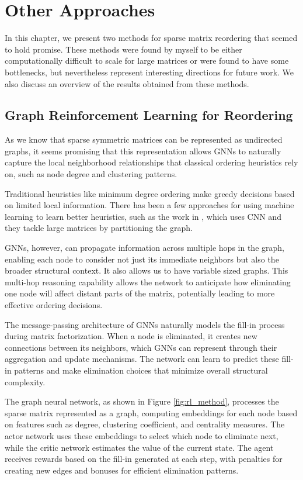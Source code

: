 \chapter{Other Approaches}
\label{ch:other_approaches}

In this chapter, we present two methods for sparse matrix reordering that seemed to hold promise. These methods were found by myself to be either computationally difficult to scale for large matrices or were found to have some bottlenecks, but nevertheless represent interesting directions for future work. We also discuss an overview of the results obtained from these methods.

\section{Graph Reinforcement Learning for Reordering}

As we know that sparse symmetric matrices can be represented as undirected graphs, it seems promising that this representation allows GNNs to naturally capture the local neighborhood relationships that classical ordering heuristics rely on, such as node degree and clustering patterns.

Traditional heuristics like minimum degree ordering make greedy decisions based on limited local information. There has been a few approaches for using machine learning to learn better heuristics, such as the work in \cite{dasgupta_alpha_2023}, which uses CNN and they tackle large matrices by partitioning the graph. 

GNNs, however, can propagate information across multiple hops in the graph, enabling each node to consider not just its immediate neighbors but also the broader structural context. It also allows us to have variable sized graphs. This multi-hop reasoning capability allows the network to anticipate how eliminating one node will affect distant parts of the matrix, potentially leading to more effective ordering decisions.

The message-passing architecture of GNNs naturally models the fill-in process during matrix factorization. When a node is eliminated, it creates new connections between its neighbors, which GNNs can represent through their aggregation and update mechanisms. The network can learn to predict these fill-in patterns and make elimination choices that minimize overall structural complexity.

The graph neural network, as shown in Figure \ref{fig:rl_method}, processes the sparse matrix represented as a graph, computing embeddings for each node based on features such as degree, clustering coefficient, and centrality measures. The actor network uses these embeddings to select which node to eliminate next, while the critic network estimates the value of the current state. The agent receives rewards based on the fill-in generated at each step, with penalties for creating new edges and bonuses for efficient elimination patterns.

